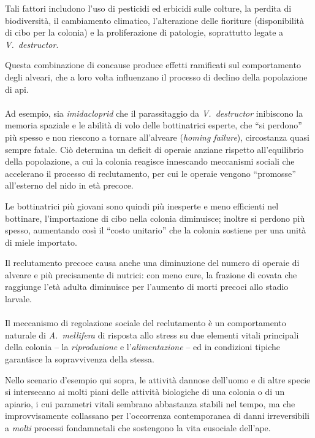 Tali fattori includono l'uso di pesticidi ed erbicidi sulle colture, la perdita di biodiversità, il cambiamento climatico, l'alterazione delle fioriture (disponibilità di cibo per la colonia) e la proliferazione di patologie, soprattutto legate a \emph{V.~destructor}.

Questa combinazione di concause produce effetti ramificati sul comportamento degli alveari, che a loro volta influenzano il processo di declino della popolazione di api.

\paragraph{}
Ad esempio, sia \emph{imidacloprid} che il parassitaggio da \emph{V.~destructor} inibiscono la memoria spaziale e le abilità di volo delle bottinatrici esperte, che ``si perdono'' più spesso e non riescono a tornare all'alveare (\emph{homing failure}), circostanza quasi sempre fatale. Ciò determina un deficit di operaie anziane rispetto all'equilibrio della popolazione, a cui la colonia reagisce innescando meccanismi sociali che accelerano il processo di reclutamento, per cui le operaie vengono ``promosse'' all'esterno del nido in età precoce.

Le bottinatrici più giovani sono quindi più inesperte e meno efficienti nel bottinare, l'importazione di cibo nella colonia diminuisce; inoltre si perdono più spesso, aumentando così il ``costo unitario'' che la colonia sostiene per una unità di miele importato.

Il reclutamento precoce causa anche una diminuzione del numero di operaie di alveare e più precisamente di nutrici:
con meno cure, la frazione di covata che raggiunge l'età adulta diminuisce per l'aumento di morti precoci allo stadio larvale.

\paragraph{}
Il meccanismo di regolazione sociale del reclutamento è un comportamento naturale di \emph{A.~mellifera}
di risposta allo stress su due elementi vitali principali della colonia -- la \emph{riproduzione} e l'\emph{alimentazione} -- ed in condizioni tipiche garantisce la sopravvivenza della stessa.

Nello scenario d'esempio qui sopra, le attività dannose dell'uomo e di altre specie si intersecano ai molti piani delle attività biologiche di una colonia o di un apiario, i cui parametri vitali sembrano abbastanza stabili nel tempo, ma che improvvisamente collassano per l'occorrenza contemporanea di danni irreversibili a \emph{molti} processi fondamnetali che sostengono la vita eusociale dell'ape.


